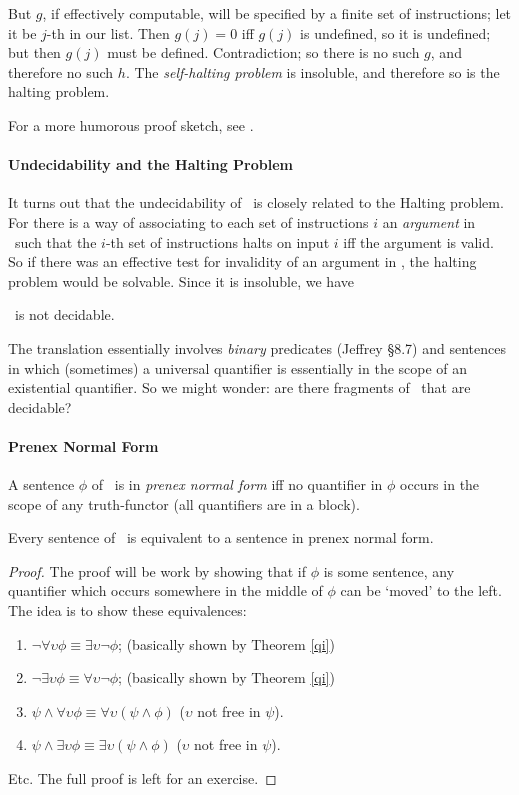 But $g$, if effectively computable, will be specified by a finite set of instructions; let it be $j$-th in our list. Then $g(j)=0$ iff $g(j)$ is undefined, so it is undefined; but then $g(j)$ must be defined. Contradiction; so there is no such $g$, and therefore no such $h$. The \emph{self-halting problem} is insoluble, and therefore so is the halting problem.

For a more humorous proof sketch, see \citet{pulscolos}.

\paragraph{Undecidability and the Halting Problem}

It turns out that the undecidability of \ltwo\ is closely related to the Halting problem. For there is a way of associating to each set of instructions $i$ an \emph{argument} in \ltwo\ such that the $i$-th set of instructions halts on input $i$ iff the argument is valid. So 	if there was an effective test for invalidity of an argument in \ltwo, the halting problem would be solvable. Since it is insoluble, we have
 \begin{theorem}
\ltwo\ is not decidable.
\end{theorem}
The translation essentially involves \emph{binary} predicates (Jeffrey \S 8.7) and sentences in which (sometimes) a universal quantifier is essentially in the scope of an existential quantifier. So we might wonder: are there fragments of \ltwo\ that are decidable? 



\paragraph{Prenex Normal Form}

A sentence $\phi$ of \ltwo\ is in \emph{prenex normal form} iff no quantifier in $\phi$ occurs in the scope of any truth-functor (all quantifiers are in a block). 
\begin{theorem}[PNF]
	Every sentence of \ltwo\ is equivalent to a sentence in prenex normal form.
\begin{proof}
	{The proof will be work by showing that if $\phi$ is some sentence, any quantifier which occurs somewhere in the middle of $\phi$ can be `moved' to the left. The idea is to show these equivalences: \begin{enumerate}
		\item $\neg\forall\upsilon\phi \equiv \exists \upsilon\neg \phi$; (basically shown by Theorem \ref{qi})
		\item $\neg \exists\upsilon\phi \equiv \forall \upsilon\neg\phi$; (basically shown by Theorem \ref{qi})
		\item $\psi \wedge \forall \upsilon \phi \equiv \forall\upsilon(\psi\wedge\phi)$ ($\upsilon$ not free in $\psi$).
		\item $\psi \wedge \exists \upsilon \phi \equiv \exists\upsilon(\psi\wedge\phi)$ ($\upsilon$ not free in $\psi$).
	\end{enumerate} Etc. The full proof is left for an exercise.}
\end{proof}\end{theorem}


